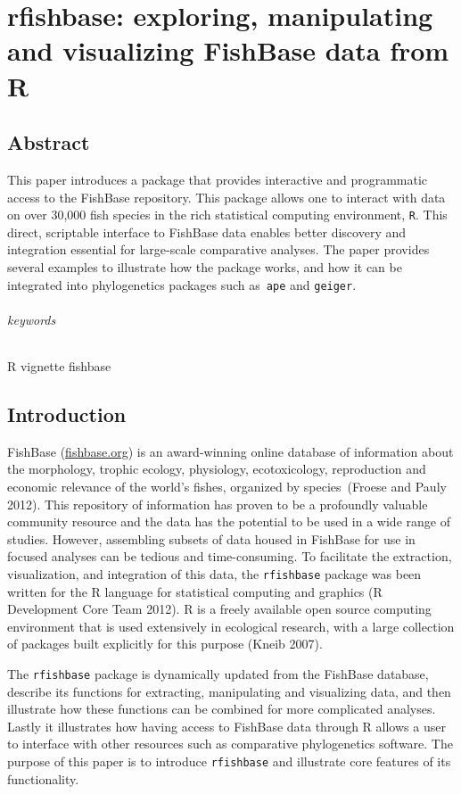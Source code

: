 

\chapter{rfishbase: exploring, manipulating and visualizing FishBase data from R}
\section{Abstract}

This paper introduces a package that provides interactive and
programmatic access to the FishBase repository. This package allows one
to interact with data on over 30,000 fish species in the rich
statistical computing environment, \texttt{R}. This direct, scriptable
interface to FishBase data enables better discovery and integration
essential for large-scale comparative analyses. The paper provides
several examples to illustrate how the package works, and how it can be
integrated into phylogenetics packages such as~\texttt{ape} and
\texttt{geiger}.

\subparagraph{keywords}

R \textbar{} vignette \textbar{} fishbase

\section{Introduction}

FishBase (\href{http://fishbase.org}{fishbase.org}) is an award-winning
online database of information about the morphology, trophic ecology,
physiology, ecotoxicology, reproduction and economic relevance of the
world's fishes, organized by species~(Froese and Pauly 2012). This
repository of information has proven to be a profoundly valuable
community resource and the data has the potential to be used in a wide
range of studies. However, assembling subsets of data housed in FishBase
for use in focused analyses can be tedious and time-consuming. To
facilitate the extraction, visualization, and integration of this data,
the \texttt{rfishbase} package was been written for the R language for
statistical computing and graphics (R Development Core Team 2012). R is
a freely available open source computing environment that is used
extensively in ecological research, with a large collection of packages
built explicitly for this purpose (Kneib 2007).

The \texttt{rfishbase} package is dynamically updated from the FishBase
database, describe its functions for extracting, manipulating and
visualizing data, and then illustrate how these functions can be
combined for more complicated analyses. Lastly it illustrates how having
access to FishBase data through R allows a user to interface with other
resources such as comparative phylogenetics software. The purpose of
this paper is to introduce \texttt{rfishbase} and illustrate core
features of its functionality.

